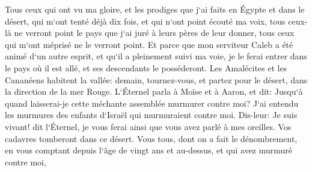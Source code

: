 \verse Tous ceux qui ont vu ma gloire, et les prodiges que j`ai faits en Égypte et dans le désert, qui m`ont tenté déjà dix fois, et qui n`ont point écouté ma voix, 
\verse tous ceux-là ne verront point le pays que j`ai juré à leurs pères de leur donner, tous ceux qui m`ont méprisé ne le verront point. 
\verse Et parce que mon serviteur Caleb a été animé d`un autre esprit, et qu`il a pleinement suivi ma voie, je le ferai entrer dans le pays où il est allé, et ses descendants le posséderont. 
\verse Les Amalécites et les Cananéens habitent la vallée: demain, tournez-vous, et partez pour le désert, dans la direction de la mer Rouge. 
\verse L`Éternel parla à Moïse et à Aaron, et dit: 
\verse Jusqu`à quand laisserai-je cette méchante assemblée murmurer contre moi? J`ai entendu les murmures des enfants d`Israël qui murmuraient contre moi. 
\verse Dis-leur: Je suis vivant! dit l`Éternel, je vous ferai ainsi que vous avez parlé à mes oreilles. 
\verse Vos cadavres tomberont dans ce désert. Vous tous, dont on a fait le dénombrement, en vous comptant depuis l`âge de vingt ans et au-dessus, et qui avez murmuré contre moi, 
